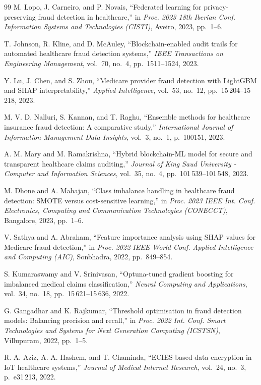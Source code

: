 \begin{thebibliography}{99}
M. Lopo, J. Carneiro, and P. Novais,
``Federated learning for privacy-preserving fraud detection in healthcare,''
in \textit{Proc. 2023 18th Iberian Conf. Information Systems and Technologies (CISTI)},
Aveiro, 2023, pp.~1--6.

T. Johnson, R. Kline, and D. McAuley,
``Blockchain-enabled audit trails for automated healthcare fraud detection systems,''
\textit{IEEE Transactions on Engineering Management},
vol.~70, no.~4, pp.~1511--1524, 2023.

Y. Lu, J. Chen, and S. Zhou,
``Medicare provider fraud detection with LightGBM and SHAP interpretability,''
\textit{Applied Intelligence},
vol.~53, no.~12, pp.~15\,204--15\,218, 2023.

M. V. D. Nalluri, S. Kannan, and T. Raghu,
``Ensemble methods for healthcare insurance fraud detection: A comparative study,''
\textit{International Journal of Information Management Data Insights},
vol.~3, no.~1, p.~100151, 2023.

A. M. Mary and M. Ramakrishna,
``Hybrid blockchain-ML model for secure and transparent healthcare claims auditing,''
\textit{Journal of King Saud University - Computer and Information Sciences},
vol.~35, no.~4, pp.~101\,539--101\,548, 2023.

M. Dhone and A. Mahajan,
``Class imbalance handling in healthcare fraud detection: SMOTE versus cost-sensitive learning,''
in \textit{Proc. 2023 IEEE Int. Conf. Electronics, Computing and Communication Technologies (CONECCT)},
Bangalore, 2023, pp.~1--6.

V. Sathya and A. Abraham,
``Feature importance analysis using SHAP values for Medicare fraud detection,''
in \textit{Proc. 2022 IEEE World Conf. Applied Intelligence and Computing (AIC)},
Sonbhadra, 2022, pp.~849--854.

S. Kumaraswamy and V. Srinivasan,
``Optuna-tuned gradient boosting for imbalanced medical claims classification,''
\textit{Neural Computing and Applications},
vol.~34, no.~18, pp.~15\,621--15\,636, 2022.

G. Gangadhar and K. Rajkumar,
``Threshold optimisation in fraud detection models: Balancing precision and recall,''
in \textit{Proc. 2022 Int. Conf. Smart Technologies and Systems for Next Generation Computing (ICSTSN)},
Villupuram, 2022, pp.~1--5.

R. A. Aziz, A. A. Hashem, and T. Chaminda,
``ECIES-based data encryption in IoT healthcare systems,''
\textit{Journal of Medical Internet Research},
vol.~24, no.~3, p.~e31\,213, 2022.


\end{thebibliography}
